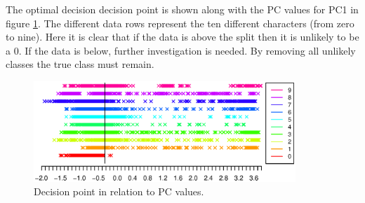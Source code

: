 
The optimal decision decision point is shown along with the PC values for PC1 in figure \ref{fig:decision_point}. 
The different data rows represent the ten different characters (from zero to nine).
Here it is clear that if the data is above the split then it is unlikely to be a 0.
If the data is below, further investigation is needed.
By removing all unlikely classes the true class must remain.

\begin{figure}[H]
\centering
\includegraphics[width = 0.88\textwidth]{graphics/decision_seperation}
\caption{Decision point in relation to PC values.}
\label{fig:decision_point}
\end{figure}


